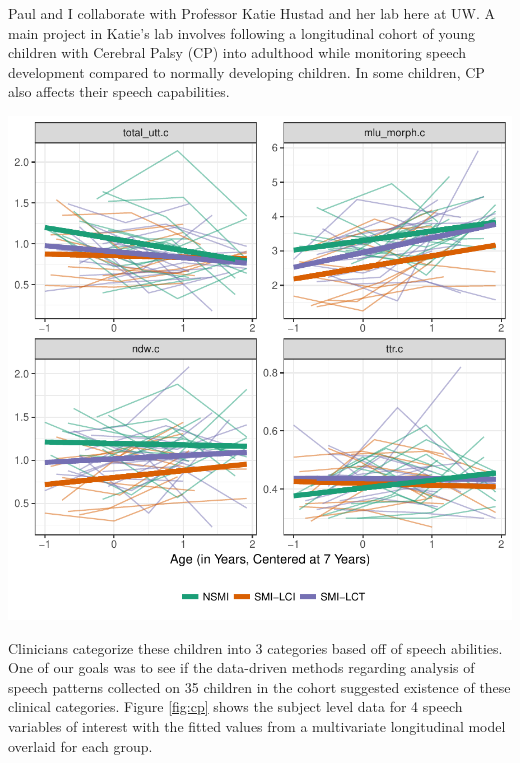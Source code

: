 \documentclass[11pt]{article}
\begin{document}
\begin{multicols}{2}
Paul and I collaborate with Professor Katie Hustad and her lab here at UW. A main project in Katie's lab involves following a longitudinal cohort of young children with Cerebral Palsy (CP) into adulthood while monitoring speech development compared to normally developing children. In some children, CP also affects their speech capabilities. 
\begin{center}\vspace{0cm}
\includegraphics[width=1\linewidth]{fitted_plots_for_speech_analysis_speech_for_handout.pdf}
\label{fig:cp}
\end{center}\vspace{0cm}
\hspace{.5cm}Clinicians categorize these children into 3 categories based off of speech abilities. One of our goals was to see if the data-driven methods regarding analysis of speech patterns collected on 35 children in the cohort suggested existence of these clinical categories.  Figure \ref{fig:cp} shows the subject level data for 4 speech variables of interest with the fitted values from a multivariate longitudinal model overlaid for each group.



\end{multicols}
\end{document}
